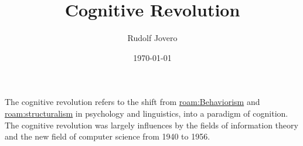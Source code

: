 \documentclass[11pt]{article}
\author{Rudolf Jovero}
\date{\today}
\title{Cognitive Revolution}
\begin{document}
\maketitle
\tableofcontents

The cognitive revolution refers to the shift from \url{roam:Behaviorism} and \url{roam:structuralism} in psychology and linguistics, into a paradigm of cognition.
The cognitive revolution was largely influences by the fields of information theory and the new field of computer science from 1940 to 1956.
\autocite{frankishCambridgeHandbookCognitive2012}
\end{document}
